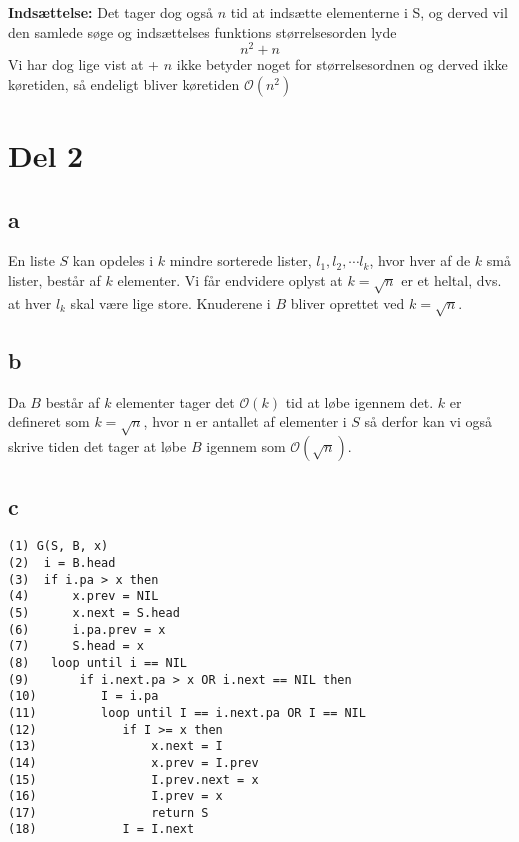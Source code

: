 \documentclass[a4paper]{article}
\begin{document}
\textbf{Indsættelse:} Det tager dog også $n$ tid at indsætte elementerne i S, og derved vil den samlede søge og indsættelses funktions størrelsesorden lyde $$n^2+n$$ Vi har dog lige vist at + $n$ ikke betyder noget for størrelsesordnen og derved ikke køretiden, så endeligt bliver køretiden $\mathcal{O}(n^2)$
\newpage
\section*{Del 2}
\subsection*{a}
En liste $S$ kan opdeles i $k$ mindre sorterede lister, $l_1, l_2, \cdots l_k$, hvor hver af de $k$ små lister, består af $k$ elementer. Vi får endvidere oplyst at $k=\sqrt n$ er et heltal, dvs. at hver $l_k$ skal være lige store.
Knuderene i $B$ bliver oprettet ved $k=\sqrt n$.

\subsection*{b}
Da $B$ består af $k$ elementer tager det $\mathcal{O}(k)$ tid at løbe igennem det. 
$k$ er defineret som $k = \sqrt{n}$, hvor n er antallet af elementer i $S$ så derfor 
kan vi også skrive tiden det tager at løbe $B$ igennem som $\mathcal{O}(\sqrt{n})$.

\subsection*{c}
\lstset{language=python} 
\begin{lstlisting} 
(1) G(S, B, x)
(2)  i = B.head
(3)  if i.pa > x then
(4)      x.prev = NIL
(5)      x.next = S.head
(6)      i.pa.prev = x
(7)      S.head = x
(8)   loop until i == NIL 
(9)       if i.next.pa > x OR i.next == NIL then
(10)         I = i.pa
(11)         loop until I == i.next.pa OR I == NIL
(12)            if I >= x then
(13)                x.next = I
(14)                x.prev = I.prev
(15)                I.prev.next = x
(16)                I.prev = x
(17)                return S
(18)            I = I.next        
\end{lstlisting}   
\end{document}
